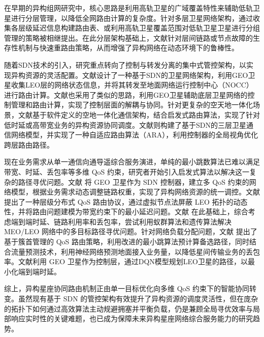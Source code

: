 \documentclass[print, master, vlined]{DissertUESTC}
\begin{document}
    在早期的异构组网研究中，核心思路是利用高轨卫星的广域覆盖特性来辅助低轨卫星进行分层管理，以降低全网路由计算的复杂度。针对多层卫星网络架构，通过收集各层级延迟信息构建路由表、或利用高轨卫星覆盖范围对低轨卫星卫星进行分组管理的策略被相继提出。在此分层架构基础上，文献\cite{10.1007/s11276-013-0656-z}针对层间链路或节点故障的生存性机制与快速重路由策略，从而增强了异构网络在动态环境下的鲁棒性。

    随着SDN技术的引入，研究重点转向了控制与转发分离的集中式管控架构，以实现异构资源的灵活配置。文献\cite{7017183}设计了一种基于SDN的卫星网络架构，利用GEO卫星收集LEO层的网络状态信息，并将其转发至地面网络运行控制中心（NOCC）进行路由计算。文献\cite{bao2014opensan}也采用了类似的思路，利用GEO卫星辅助底层卫星网络的控制管理和路由计算，实现了控制层面的解耦与协同。针对更复杂的空天地一体化场景，文献\cite{li2017service}基于软件定义的空地一体化通信架构，结合启发式路由算法，实现了针对低时延或高带宽业务的异构资源协同调度。文献\cite{8766918}则构建了基于SDN的三层卫星通信网络模型，并实现了一种自适应路由算法（ARA），利用控制器的全局视角优化跨层路由路径。

    现在业务需求从单一通信向通导遥综合服务演进，单纯的最小跳数算法已难以满足带宽、时延、丢包率等多维 QoS 约束，研究者开始引入启发式算法以解决这一复杂的路径寻优问题。文献\cite{石晓东2020基于} 将 GEO 卫星作为 SDN 控制器，建立多 QoS 约束的网络模型，根据业务需求动态调整链路权重，实现了异构网络资源的统一调控。文献\cite{zhou2007novel} 提出了一种层级分布式 QoS 路由协议，通过虚拟节点法屏蔽 LEO 拓扑的动态性，并将路由问题建模为带宽约束下的最小延迟问题。文献\cite{long2010sustainable} 在此基础上，综合考虑端到端时延、链路利用率和丢包率，尝试利用蚁群算法和遗传算法解决 MEO/LEO 网络中的多目标路径寻优问题。针对网络负载分配问题，文献\cite{冯玺宝2016多层卫星网络} 提出了基于簇首管理的 QoS 路由策略，利用改进的最小跳算法预计算备选路径，同时结合流量预测技术，利用神经网络预测地面接入业务量，以降低星间传输业务的丢包率。文献\cite{1024075130.nh}利用 GEO 卫星作为控制层，通过DQN模型规划LEO卫星的路径，以最小化端到端时延。

    综上，异构星座协同路由机制正由单一目标优化向多维 QoS 约束下的智能协同转变。虽然现有基于 SDN 的管控架构有效提升了异构资源的调度灵活性，但在庞杂的拓扑下如何通过高效算法主动规避拥塞并平衡负载，仍是兼顾全局寻优效率与局部响应实时性的关键难题，也已成为保障未来异构星座网络综合服务能力的研究趋势。
    
\end{document}
